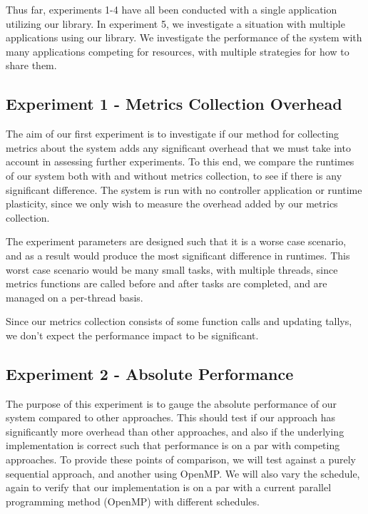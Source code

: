 Thus far, experiments 1-4 have all been conducted with a single application utilizing our library. In experiment 5, we investigate a situation with multiple applications using our library. We investigate the performance of the system with many applications competing for resources, with multiple strategies for how to share them.



\subsection{Experiment 1 - Metrics Collection Overhead}

The aim of our first experiment is to investigate if our method for collecting metrics about the system adds any significant overhead that we must take into account in assessing further experiments. To this end, we compare the runtimes of our system both with and without metrics collection, to see if there is any significant difference. The system is run with no controller application or runtime plasticity, since we only wish to measure the overhead added by our metrics collection. 

The experiment parameters are designed such that it is a worse case scenario, and as a result would produce the most significant difference in runtimes. This worst case scenario would be many small tasks, with multiple threads, since metrics functions are called before and after tasks are completed, and are managed on a per-thread basis.

Since our metrics collection consists of some function calls and updating tallys, we don't expect the performance impact to be significant. 





\subsection{Experiment 2 - Absolute Performance}

The purpose of this experiment is to gauge the absolute performance of our system compared to other approaches. This should test if our approach has significantly more overhead than other approaches, and also if the underlying implementation is correct such that performance is on a par with competing approaches. To provide these points of comparison, we will test against a purely sequential approach, and another using OpenMP. We will also vary the schedule, again to verify that our implementation is on a par with a current parallel programming method (OpenMP) with different schedules.

